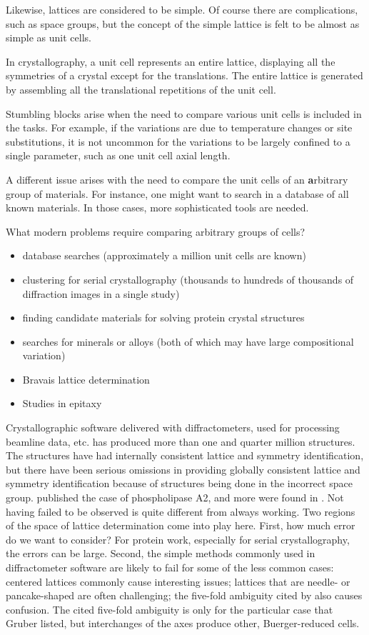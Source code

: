 \documentclass[preprint]{iucr}              %
\numberwithin{equation}{section}
\begin{document}
Likewise, lattices are considered to be simple. Of course
there are complications, such as space groups, but the concept
of the simple lattice is felt to be almost as simple as
unit cells.

In crystallography, a unit cell represents an entire lattice, displaying all the symmetries of a crystal except for the translations.  The entire lattice is generated by assembling all the translational repetitions of the unit cell.
	
Stumbling blocks arise when the need to compare various unit
cells is included in the tasks. For example, if the variations are due
to temperature changes or site substitutions, it is not
uncommon for the variations to be largely confined to a single
parameter, such as one unit cell axial length. 

A different issue arises with the need to compare the unit
cells of an \textbf{a}rbitrary group of materials. For instance, one
might want to search in a database of all known materials. In
those cases, more sophisticated tools are needed. 

What modern problems require comparing arbitrary groups of cells?
\begin{itemize}
	\item database searches (approximately a million unit cells are known)
	\item clustering for serial crystallography (thousands to hundreds of thousands of diffraction images in a single study)
	\item finding candidate materials for solving protein crystal structures 
	\cite{nanao2022id23}
	\item searches for minerals or alloys (both of which may have large compositional variation)
	\item Bravais lattice determination
	\item Studies in epitaxy \cite{yang2014unit}
\end{itemize}

Crystallographic software delivered with diffractometers, used for processing
beamline data, etc. has produced more than one and quarter million structures. The structures have had internally consistent lattice and
symmetry identification, but there have been serious omissions in 
providing globally consistent lattice and symmetry identification
because of structures being done in the incorrect space group.
 published the case of phospholipase
A2, and more were found in .
Not having failed to be observed is quite different from always working. Two regions of the space of lattice determination come into play here. 
First, how much error do we want to consider? For protein work, especially for serial crystallography, the errors can be large. Second, the simple methods commonly used in 
diffractometer software are likely to fail for 
some of the less common cases: centered lattices commonly cause interesting issues; lattices that are needle- or pancake-shaped are often challenging;
the five-fold ambiguity cited by  also causes confusion. The cited five-fold ambiguity is only for the particular
case that Gruber listed, but interchanges of the axes produce
other, Buerger-reduced cells.
	
\end{document}
